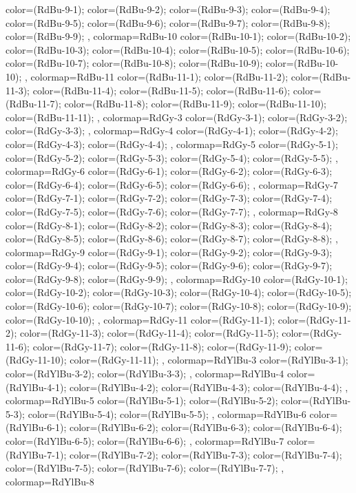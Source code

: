 {{color=(RdBu-9-1);
color=(RdBu-9-2);
color=(RdBu-9-3);
color=(RdBu-9-4);
color=(RdBu-9-5);
color=(RdBu-9-6);
color=(RdBu-9-7);
color=(RdBu-9-8);
color=(RdBu-9-9);
},
colormap={RdBu-10}{
color=(RdBu-10-1);
color=(RdBu-10-2);
color=(RdBu-10-3);
color=(RdBu-10-4);
color=(RdBu-10-5);
color=(RdBu-10-6);
color=(RdBu-10-7);
color=(RdBu-10-8);
color=(RdBu-10-9);
color=(RdBu-10-10);
},
colormap={RdBu-11}{
color=(RdBu-11-1);
color=(RdBu-11-2);
color=(RdBu-11-3);
color=(RdBu-11-4);
color=(RdBu-11-5);
color=(RdBu-11-6);
color=(RdBu-11-7);
color=(RdBu-11-8);
color=(RdBu-11-9);
color=(RdBu-11-10);
color=(RdBu-11-11);
},
colormap={RdGy-3}{
color=(RdGy-3-1);
color=(RdGy-3-2);
color=(RdGy-3-3);
},
colormap={RdGy-4}{
color=(RdGy-4-1);
color=(RdGy-4-2);
color=(RdGy-4-3);
color=(RdGy-4-4);
},
colormap={RdGy-5}{
color=(RdGy-5-1);
color=(RdGy-5-2);
color=(RdGy-5-3);
color=(RdGy-5-4);
color=(RdGy-5-5);
},
colormap={RdGy-6}{
color=(RdGy-6-1);
color=(RdGy-6-2);
color=(RdGy-6-3);
color=(RdGy-6-4);
color=(RdGy-6-5);
color=(RdGy-6-6);
},
colormap={RdGy-7}{
color=(RdGy-7-1);
color=(RdGy-7-2);
color=(RdGy-7-3);
color=(RdGy-7-4);
color=(RdGy-7-5);
color=(RdGy-7-6);
color=(RdGy-7-7);
},
colormap={RdGy-8}{
color=(RdGy-8-1);
color=(RdGy-8-2);
color=(RdGy-8-3);
color=(RdGy-8-4);
color=(RdGy-8-5);
color=(RdGy-8-6);
color=(RdGy-8-7);
color=(RdGy-8-8);
},
colormap={RdGy-9}{
color=(RdGy-9-1);
color=(RdGy-9-2);
color=(RdGy-9-3);
color=(RdGy-9-4);
color=(RdGy-9-5);
color=(RdGy-9-6);
color=(RdGy-9-7);
color=(RdGy-9-8);
color=(RdGy-9-9);
},
colormap={RdGy-10}{
color=(RdGy-10-1);
color=(RdGy-10-2);
color=(RdGy-10-3);
color=(RdGy-10-4);
color=(RdGy-10-5);
color=(RdGy-10-6);
color=(RdGy-10-7);
color=(RdGy-10-8);
color=(RdGy-10-9);
color=(RdGy-10-10);
},
colormap={RdGy-11}{
color=(RdGy-11-1);
color=(RdGy-11-2);
color=(RdGy-11-3);
color=(RdGy-11-4);
color=(RdGy-11-5);
color=(RdGy-11-6);
color=(RdGy-11-7);
color=(RdGy-11-8);
color=(RdGy-11-9);
color=(RdGy-11-10);
color=(RdGy-11-11);
},
colormap={RdYlBu-3}{
color=(RdYlBu-3-1);
color=(RdYlBu-3-2);
color=(RdYlBu-3-3);
},
colormap={RdYlBu-4}{
color=(RdYlBu-4-1);
color=(RdYlBu-4-2);
color=(RdYlBu-4-3);
color=(RdYlBu-4-4);
},
colormap={RdYlBu-5}{
color=(RdYlBu-5-1);
color=(RdYlBu-5-2);
color=(RdYlBu-5-3);
color=(RdYlBu-5-4);
color=(RdYlBu-5-5);
},
colormap={RdYlBu-6}{
color=(RdYlBu-6-1);
color=(RdYlBu-6-2);
color=(RdYlBu-6-3);
color=(RdYlBu-6-4);
color=(RdYlBu-6-5);
color=(RdYlBu-6-6);
},
colormap={RdYlBu-7}{
color=(RdYlBu-7-1);
color=(RdYlBu-7-2);
color=(RdYlBu-7-3);
color=(RdYlBu-7-4);
color=(RdYlBu-7-5);
color=(RdYlBu-7-6);
color=(RdYlBu-7-7);
},
colormap={RdYlBu-8}{
}}
